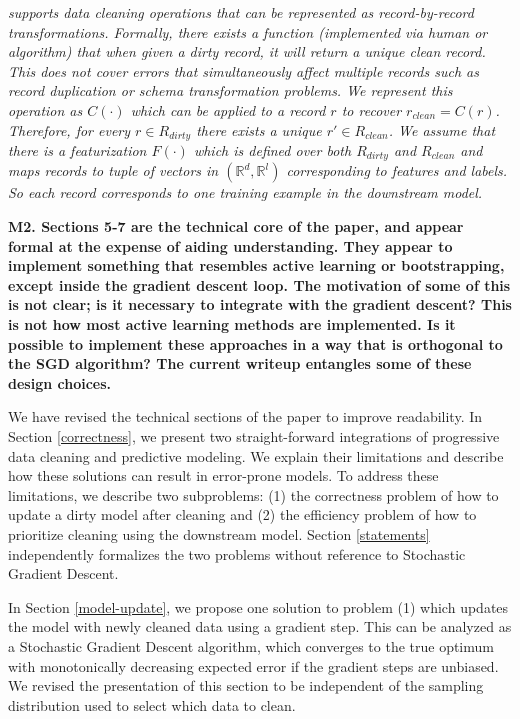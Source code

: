 \emph{\sys supports data cleaning operations that can be represented as record-by-record transformations.
Formally, there exists a function (implemented via human or algorithm) that when given a dirty record, it will return a unique clean record.
This does not cover errors that simultaneously affect multiple records such as record duplication or schema transformation problems.
We represent this operation as $C(\cdot)$ which can be applied to a record $r$ to recover $r_{clean} = C(r)$.
Therefore, for every $r \in R_{dirty}$ there exists a unique $r' \in R_{clean}$.
We assume that there is a featurization $F(\cdot)$ which is defined over both $R_{dirty}$ and $R_{clean}$ and maps records to tuple of vectors in $(\mathbb{R}^d, \mathbb{R}^l)$ corresponding to features and labels.
So each record corresponds to one training example in the downstream model.}

\vspace{0.5em}

\noindent\textbf{M2. Sections 5-7 are the technical core of the paper, and appear formal at the expense of aiding understanding. They appear to implement something that resembles active learning or bootstrapping, except inside the gradient descent loop. The motivation of some of this is not clear; is it necessary to integrate with the gradient descent? This is not how most active learning methods are implemented. Is it possible to implement these approaches in a way that is orthogonal to the SGD algorithm? The current writeup entangles some of these design choices.} 

We have revised the technical sections of the paper to improve readability.
In Section \ref{correctness}, we present two straight-forward integrations of progressive data cleaning and predictive modeling. 
We explain their limitations and describe how these solutions can result in error-prone models.
To address these limitations, we describe two subproblems: (1) the correctness problem of how to update a dirty model after cleaning and (2) the efficiency problem of how to prioritize cleaning using the downstream model. 
Section \ref{statements} independently formalizes the two problems without reference to Stochastic Gradient Descent.

In Section \ref{model-update}, we propose one solution to problem (1) which updates the model with newly cleaned data using a gradient step.
This can be analyzed as a Stochastic Gradient Descent algorithm, which converges to the true optimum with monotonically decreasing expected error if the gradient steps are unbiased.
We revised the presentation of this section to be independent of the sampling distribution used to select which data to clean.

